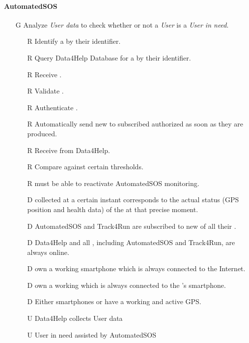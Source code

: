 \documentclass[../../../rasd.tex]{subfiles}
\begin{document}
\paragraph{AutomatedSOS}
\begin{itemize}
	\item[G\subs{6}]Analyze \textit{User data} to check whether or not a \textit{User} is a \textit{User in need}.
	\begin{itemize}
		\item[R\subs{6}]Identify a  by their identifier.
		\item[R\subs{7}]Query Data4Help Database for a  by their identifier.
		\item[R\subs{8}]Receive .
		\item[R\subs{9}]Validate .
		\item[R\subs{10}]Authenticate .
		\item[R\subs{29}]Automatically send new  to subscribed authorized  as soon as they are produced.
		\item[R\subs{36}]Receive  from Data4Help.
		\item[R\subs{37}]Compare  against certain thresholds.
		\item[R\subs{39}] must be able to reactivate AutomatedSOS monitoring.
		\\
		\item[D\subs{2}] collected at a certain instant corresponds to the actual status (GPS position and health data) of the  at that precise moment.              
		\item[D\subs{6}]AutomatedSOS and Track4Run are subscribed to new  of all their .
		\item[D\subs{9}]Data4Help and all , including AutomatedSOS and Track4Run, are always online.
		\item[D\subs{10}] own a working smartphone which is always connected to the Internet.
		\item[D\subs{11}] own a working  which is always connected to the 's smartphone.
		\item[D\subs{12}]Either smartphones or  have a working and active GPS.
		\\
		\item[U\subs{5}]Data4Help collects User data
		\item[U\subs{12}]User in need assisted by AutomatedSOS
	\end{itemize}


\end{itemize}
\end{document}
